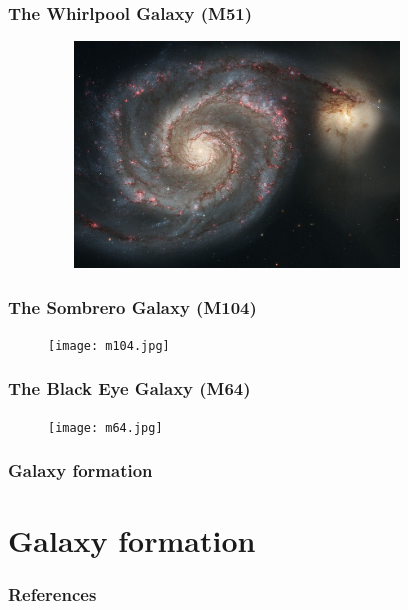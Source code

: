 \documentclass{beamer}
\begin{document}
\begin{frame}
\frametitle{The Whirlpool Galaxy (M51)}
\begin{figure}
\includegraphics[width=100mm, height=60mm]{m51.jpg}
\nocite{nasa2010}
\end{figure}
\end{frame}

\begin{frame}
\frametitle{The Sombrero Galaxy (M104)}
\begin{figure}
\texttt{[image: m104.jpg]}
\nocite{nasa2010}
\end{figure}
\end{frame}

\begin{frame}
\frametitle{The Black Eye Galaxy (M64)}
\begin{figure}
\texttt{[image: m64.jpg]}
\nocite{nasa2010}
\end{figure}
\end{frame}


\begin{frame}
\frametitle{Galaxy formation}
\begin{center}
\end{center}
\end{frame}

\section{Galaxy formation}

\begin{frame}[t]
\frametitle{References}


\end{frame}
\end{document}
